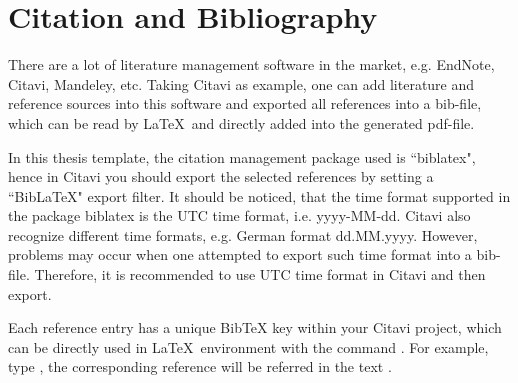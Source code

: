 \chapter{Citation and Bibliography}

\graphicspath{ {graphics/Chapter5/} }

There are a lot of literature management software in the market, e.g. EndNote, Citavi, Mandeley, etc. Taking Citavi as example, one can add literature and reference sources into this software and exported all references into a bib-file, which can be read by \LaTeX~and directly added into the generated pdf-file.

In this thesis template, the citation management package used is ``biblatex", hence in Citavi you should export the selected references by setting a ``BibLaTeX" export filter. It should be noticed, that the time format supported in the package biblatex is the UTC time format, i.e. yyyy-MM-dd. Citavi also recognize different time formats, e.g. German format dd.MM.yyyy. However, problems may occur when one attempted to export such time format into a bib-file. Therefore, it is recommended to use UTC time format in Citavi and then export.

Each reference entry has a unique BibTeX key within your Citavi project, which can be directly used in \LaTeX~environment with the command {\color{blue}{\verb|\cite|}}. For example, type {} , the corresponding reference will be referred in the text \cite{Burger.20180508}.
